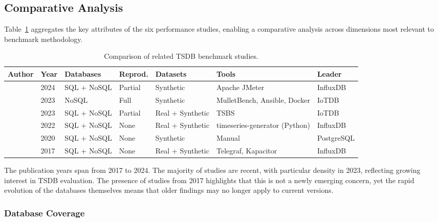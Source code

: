 \subsection{Comparative Analysis}

Table~\ref{tab:related} aggregates the key attributes of the six performance studies, enabling
a comparative analysis across dimensions most relevant to benchmark methodology.

\begin{table}[t]
  \centering
  \footnotesize
  \caption{Comparison of related TSDB benchmark studies.}
  \label{tab:related}
  \begin{tabular}{lllllll}
    \hline
    \textbf{Author} & \textbf{Year} & \textbf{Databases} & \textbf{Reprod.} & \textbf{Datasets} & \textbf{Tools} & \textbf{Leader} \\
    \hline
    \cite{lima2024avaliando}       & 2024 & SQL + NoSQL & Partial & Synthetic          & Apache JMeter                 & InfluxDB \\
    \cite{pereira2023mulletbench}  & 2023 & NoSQL       & Full    & Synthetic          & MulletBench, Ansible, Docker  & IoTDB    \\
    \cite{wang2023iotdb}           & 2023 & SQL + NoSQL & Partial & Real + Synthetic   & TSBS                          & IoTDB    \\
    \cite{shah2022performance}     & 2022 & SQL + NoSQL & None    & Real + Synthetic   & timeseries-generator (Python) & InfluxDB \\
    \cite{grzesik2020comparative}  & 2020 & SQL + NoSQL & None    & Synthetic          & Manual                        & PostgreSQL \\
    \cite{naqvi2017influxdb}       & 2017 & SQL + NoSQL & None    & Real + Synthetic   & Telegraf, Kapacitor            & InfluxDB \\
    \hline
  \end{tabular}
\end{table}

The publication years span from 2017 to 2024. The majority of studies are recent, with
particular density in 2023, reflecting growing interest in TSDB evaluation. The presence of
studies from 2017 highlights that this is not a newly emerging concern, yet the rapid evolution
of the databases themselves means that older findings may no longer apply to current versions.

\subsubsection{Database Coverage}

